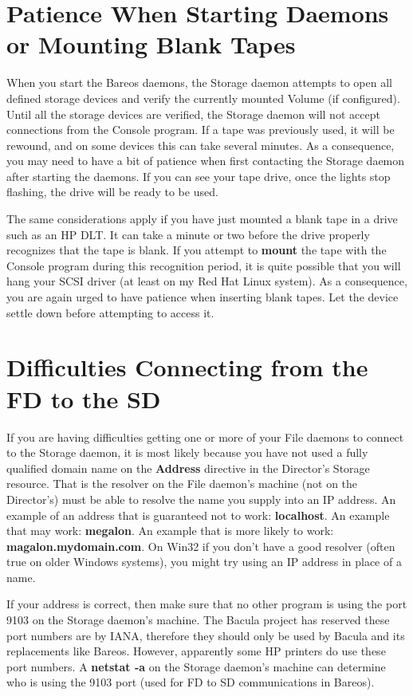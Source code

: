 \section{Patience When Starting Daemons or Mounting Blank Tapes}

When you start the Bareos daemons, the Storage daemon attempts to open all
defined storage devices and verify the currently mounted Volume (if
configured). Until all the storage devices are verified, the Storage daemon
will not accept connections from the Console program. If a tape was previously
used, it will be rewound, and on some devices this can take several minutes.
As a consequence, you may need to have a bit of patience when first contacting
the Storage daemon after starting the daemons. If you can see your tape drive,
once the lights stop flashing, the drive will be ready to be used.

The same considerations apply if you have just mounted a blank tape in a drive
such as an HP DLT. It can take a minute or two before the drive properly
recognizes that the tape is blank. If you attempt to {\bf mount} the tape with
the Console program during this recognition period, it is quite possible that
you will hang your SCSI driver (at least on my Red Hat Linux system). As a
consequence, you are again urged to have patience when inserting blank tapes.
Let the device settle down before attempting to access it.

\section{Difficulties Connecting from the FD to the SD}

If you are having difficulties getting one or more of your File daemons to
connect to the Storage daemon, it is most likely because you have not used a
fully qualified domain name on the {\bf Address} directive in the
Director's Storage resource. That is the resolver on the File daemon's machine
(not on the Director's) must be able to resolve the name you supply into an IP
address. An example of an address that is guaranteed not to work: {\bf
localhost}. An example that may work: {\bf megalon}. An example that is more
likely to work: {\bf magalon.mydomain.com}. On Win32 if you don't have a good
resolver (often true on older Windows systems), you might try using an IP
address in place of a name.

If your address is correct, then make sure that no other program is using the
port 9103 on the Storage daemon's machine. The Bacula project has reserved 
these port numbers are by IANA, therefore they should only be used by Bacula and its replacements like Bareos.
However, apparently
some HP printers do use these port numbers. A {\bf netstat -a} on the Storage
daemon's machine can determine who is using the 9103 port (used for FD to SD
communications in Bareos).

